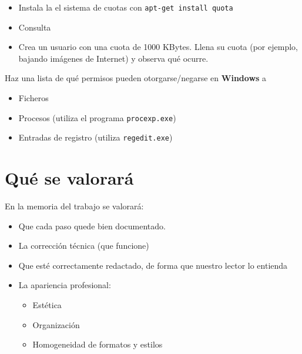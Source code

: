 \begin{homeworkProblem}
  \begin{itemize}
  \item Instala la el sistema de cuotas con \texttt{apt-get install quota}
  \item Consulta 
    
  \item Crea un usuario con una cuota de 1000 KBytes. Llena su cuota (por ejemplo, bajando imágenes de Internet) y observa qué ocurre.
  \end{itemize}
\end{homeworkProblem}


\begin{homeworkProblem}

  Haz una lista de qué permisos pueden otorgarse/negarse en \textbf{Windows} a

  \begin{itemize}
  \item Ficheros
  \item Procesos (utiliza el programa \texttt{procexp.exe})
  \item Entradas de registro (utiliza \texttt{regedit.exe})
  \end{itemize}
\end{homeworkProblem}



\section{Qué se valorará}
En la memoria del trabajo se valorará:
\begin{itemize}
\item Que cada paso quede bien documentado. 
\item La corrección técnica (que funcione)
\item Que esté correctamente redactado, de forma que nuestro lector lo entienda 
\item La apariencia profesional:
  \begin{itemize}
  \item Estética
  \item Organización
  \item Homogeneidad de formatos y estilos
  \end{itemize}
\end{itemize}

